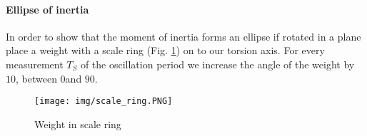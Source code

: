 \paragraph{Ellipse of inertia}

In order to show that the moment of inertia forms an ellipse if rotated in a plane place a weight with a scale ring (Fig. \ref{fig::ring}) on to our torsion axis.
For every measurement $T_S$ of the oscillation period we increase the angle of the weight by $10$\textdegree, between $0$\textdegree \space and $90$\textdegree.

\begin{figure} [ht]
	\centering
	\texttt{[image: img/scale\_ring.PNG]}
	\caption{Weight in scale ring \cite{website}}
	\label{fig::ring}
\end{figure}

